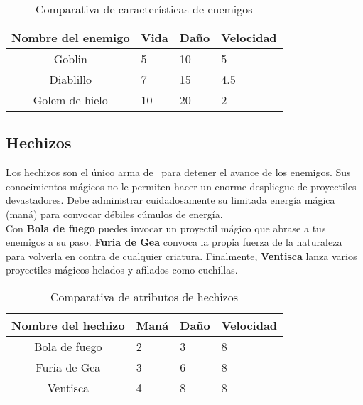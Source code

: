 
\begin{table}[H]
  \label{caracteristicas-enemigos}
  \begin{center}
  \begin{tabular}{| c ||m{2cm}|m{2cm}|m{2cm}|}
    \hline
    Nombre del enemigo & Vida & Daño & Velocidad \\
    \hline
    Goblin & 5 & 10 & 5 \\
    \hline
    Diablillo & 7 & 15 & 4.5 \\
    \hline 
    Golem de hielo & 10 & 20 & 2 \\
    \hline
  \end{tabular}
\end{center}
\caption{Comparativa de características de enemigos}
\end{table}

\subsection*{Hechizos}

Los hechizos son el único arma de \prota\ para detener el avance de los
enemigos. Sus conocimientos mágicos no le permiten hacer un enorme despliegue
de proyectiles devastadores. Debe administrar cuidadosamente su limitada
energía mágica (maná) para convocar débiles cúmulos de energía.\\

Con \textbf{Bola de fuego} puedes invocar un proyectil mágico que abrase
a tus enemigos a su paso. \textbf{Furia de Gea} convoca la propia fuerza
de la naturaleza para volverla en contra de cualquier criatura. Finalmente,
\textbf{Ventisca} lanza varios proyectiles mágicos helados y afilados como
cuchillas.\\

\begin{table}[H]
  \label{caracteristicas-hechizos}
  \begin{center}
  \begin{tabular}{| c ||m{2cm}|m{2cm}|m{2cm}|}
    \hline
    Nombre del hechizo & Maná & Daño & Velocidad \\
    \hline
    Bola de fuego & 2 & 3 & 8 \\
    \hline
    Furia de Gea & 3 & 6 & 8 \\
    \hline 
    Ventisca & 4 & 8 & 8 \\
    \hline
  \end{tabular}
\end{center}
\caption{Comparativa de atributos de hechizos}
\end{table}


